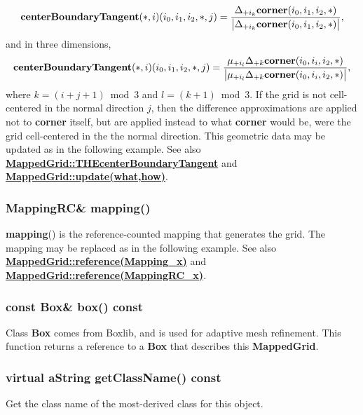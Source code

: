 \documentclass{article}
\begin{document}
    \[
      \textbf{centerBoundaryTangent}(*,i)(i_0,i_1,i_2,\ast,j) = {\Delta_{+i_k} \textbf{corner}(i_0,i_1,i_2,\ast) \over
                                                              \big| \Delta_{+i_k} \textbf{corner}(i_0,i_1,i_2,\ast) \big|},
    \]
    and in three dimensions,
    \[
      \textbf{centerBoundaryTangent}(*,i)(i_0,i_1,i_2,\ast,j) = {\mu_{+i_l} \Delta_{+k} \textbf{corner}(i_0,i_i,i_2,\ast) \over
                                                              \big| \mu_{+i_l} \Delta_{+k} \textbf{corner}(i_0,i_i,i_2,\ast) \big|},
    \]
    where $k=(i+j+1)\bmod3$ and $l=(k+1)\bmod3$.
    If the grid is not cell-centered in the normal direction $j$, then the difference approximations are applied not to \textbf{corner} itself,
    but are applied instead to what \textbf{corner} would be, were the grid cell-centered in the the normal direction.
    This geometric data may be updated as in the following example.
    See also {\bf{}\hyperref{THEcenterBoundaryTangent}{THEcenterBoundaryTangent \rm(\S}{)}{MappedGrid::THEcenterBoundaryTangent}}
    and {\bf{}\hyperref{update(what,how)}{update(what,how) \rm(\S}{)}{MappedGrid::update(what,how)}}.

  \subsubsection{MappingRC\& mapping()}
  \label{MappedGrid::mapping()}
    \textbf{mapping}() is the reference-counted mapping that generates the grid.
    The mapping may be replaced as in the following example.
    See also {\bf{}\hyperref{reference(const Mapping\& x)}{reference(const Mapping\& x) \rm(\S}{)}{MappedGrid::reference(Mapping_x)}}
    and {\bf{}\hyperref{reference(const MappingRC\&~x)}{reference(const MappingRC\&~x) \rm(\S}{)}{MappedGrid::reference(MappingRC_x)}}.

  \subsubsection{const Box\& box() const}
  \label{MappedGrid::box()}
    Class \textbf{Box} comes from Boxlib, and is used for adaptive mesh refinement.
    This function returns a reference to a \textbf{Box} that describes this \textbf{MappedGrid}.

  \subsubsection{virtual aString getClassName() const}
  \label{MappedGrid::getClassName() const}
    Get the class name of the most-derived class for this object.
\end{document}
